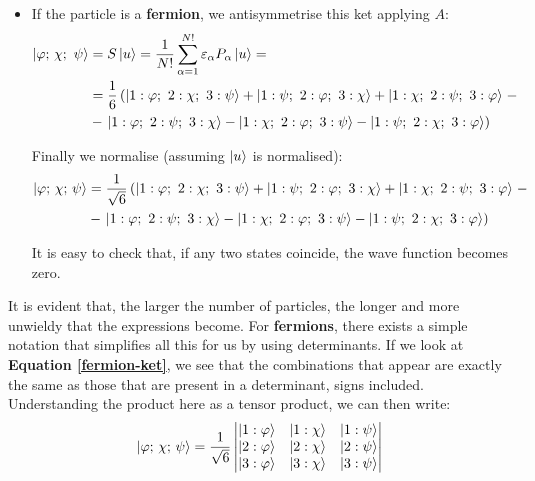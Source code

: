 \begin{itemize}
    \item If the particle is a \textbf{fermion}, we antisymmetrise this ket applying $A$:
    \begin{equation}
        \begin{split}
            \ket{\varphi;\, \chi;\ \psi} &= S\ket{u} = \frac{1}{N!}\sum_{\alpha=1}^{N!} \varepsilon_\alpha P_\alpha\ket{u} = \\
            &= \frac{1}{6} \left(\ket{1:\varphi;\ 2:\chi;\ 3: \psi} + \ket{1:\psi;\ 2:\varphi;\ 3: \chi} + \ket{1:\chi;\ 2:\psi;\ 3: \varphi}\right. -\\ 
            &- \left.\ket{1:\varphi;\ 2:\psi;\ 3: \chi} - \ket{1:\chi;\ 2:\varphi;\ 3: \psi} - \ket{1:\psi;\ 2:\chi;\ 3: \varphi}\right)
        \end{split}
    \end{equation}

    Finally we normalise (assuming $\ket{u}$ is normalised):
    \begin{equation} \label{fermion-ket}
        \begin{split}
            \ket{\varphi;\, \chi;\, \psi} &= \frac{1}{ \sqrt{6}} \left(\ket{1:\varphi;\ 2:\chi;\ 3: \psi} + \ket{1:\psi;\ 2:\varphi;\ 3: \chi} + \ket{1:\chi;\ 2:\psi;\ 3: \varphi}\right. -\\ 
            &- \left.\ket{1:\varphi;\ 2:\psi;\ 3: \chi} - \ket{1:\chi;\ 2:\varphi;\ 3: \psi} - \ket{1:\psi;\ 2:\chi;\ 3: \varphi}\right)
        \end{split}
    \end{equation}

    It is easy to check that, if any two states coincide, the wave function becomes zero. 
\end{itemize}

It is evident that, the larger the number of particles, the longer and more unwieldy that the expressions become. For \textbf{fermions}, there exists a simple notation that simplifies all this for us by using determinants. If we look at \textbf{Equation \ref{fermion-ket}}, we see that the combinations that appear are exactly the same as those that are present in a determinant, signs included. Understanding the product here as a tensor product, we can then write:
\begin{equation}
    \ket{\varphi;\, \chi;\, \psi} = \frac{1}{\sqrt{6}}\left|\begin{matrix}
        \ket{1:\varphi} & \ket{1:\chi} & \ket{1:\psi} \\
        \ket{2:\varphi} & \ket{2:\chi} & \ket{2:\psi} \\
        \ket{3:\varphi} & \ket{3:\chi} & \ket{3:\psi} \\
    \end{matrix}\right|
\end{equation}

